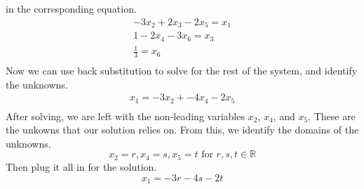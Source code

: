 \begin{exmp}
    in the corresponding equation.
    \begin{align*}
        -3x_2 + 2x_3 - 2x_5 = x_1 \\
        1 - 2x_4 - 3x_6 = x_3 \\
        \frac{1}{3} = x_6 \\
    \end{align*}
    Now we can use back substitution to solve for the rest of the system, and
    identify the unknowns.
    \begin{align*}
        x_1 = -3x_2 + -4x_4 - 2x_5 \\
    \end{align*}
    After solving, we are left with the non-leading variables $x_2$, $x_4$, and
    $x_5$. These are the unkowns that our solution relies on. From this, we
    identify the domains of the unknowns.
    \begin{equation*}
        x_2 = r, x_4 = s, x_5 = t \text{ for } r,s,t \in \mathbb{R}
    \end{equation*}
    Then plug it all in for the solution.
    \begin{equation*}
        x_1 = -3r - 4s - 2t
    \end{equation*}
\end{exmp}

